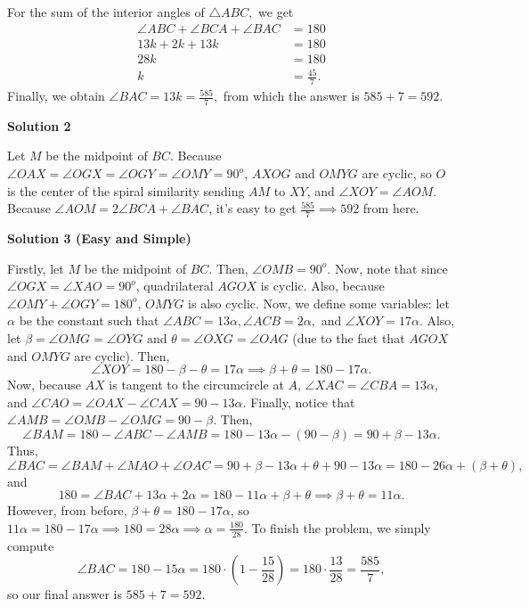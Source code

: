 \begin{enumerate}
 For the sum of the interior angles of $\triangle ABC,$ we get
 \begin{align*} \angle ABC + \angle BCA + \angle BAC &= 180 \\ 13k+2k+13k&=180 \\ 28k&=180 \\ k&=\frac{45}{7}. \end{align*}
Finally, we obtain $\angle BAC=13k=\frac{585}{7},$ from which the answer is $585+7=\boxed{592}.$




\textbf{Solution 2}

Let $M$ be the midpoint of $BC$. Because $\angle{OAX}=\angle{OGX}=\angle{OGY}=\angle{OMY}=90^o$, $AXOG$ and $OMYG$ are cyclic, so $O$ is the center of the spiral similarity sending $AM$ to $XY$, and $\angle{XOY}=\angle{AOM}$. Because $\angle{AOM}=2\angle{BCA}+\angle{BAC}$, it's easy to get $\frac{585}{7} \implies \boxed{592}$ from here.

 



\textbf{Solution 3 (Easy and Simple)}

Firstly, let $M$ be the midpoint of $BC$. Then, $\angle OMB = 90^o$. Now, note that since $\angle OGX = \angle XAO = 90^o$, quadrilateral $AGOX$ is cyclic. Also, because $\angle OMY + \angle OGY = 180^o$, $OMYG$ is also cyclic. Now, we define some variables: let $\alpha$ be the constant such that $\angle ABC = 13\alpha, \angle ACB = 2\alpha,$ and $\angle XOY = 17\alpha$. Also, let $\beta = \angle OMG = \angle OYG$ and $\theta = \angle OXG = \angle OAG$ (due to the fact that $AGOX$ and $OMYG$ are cyclic). Then, 
 \[\angle XOY = 180 - \beta - \theta = 17\alpha \implies \beta + \theta = 180 - 17\alpha.\] Now, because $AX$ is tangent to the circumcircle at $A$, $\angle XAC = \angle CBA = 13\alpha$, and $\angle CAO = \angle OAX - \angle CAX = 90 - 13\alpha$. Finally, notice that $\angle AMB = \angle OMB - \angle OMG = 90 - \beta$. Then, 
 \[\angle BAM = 180 - \angle ABC - \angle AMB = 180 - 13\alpha - (90 - \beta) = 90 + \beta - 13\alpha.\] Thus, 
 \[\angle BAC = \angle BAM + \angle MAO + \angle OAC = 90 + \beta - 13\alpha + \theta + 90 - 13\alpha = 180 - 26\alpha + (\beta + \theta),\] and 
 \[180 = \angle BAC + 13\alpha + 2\alpha = 180 - 11\alpha + \beta + \theta \implies \beta + \theta = 11\alpha.\] However, from before, $\beta+\theta = 180 - 17 \alpha$, so $11 \alpha = 180 - 17 \alpha \implies 180 = 28 \alpha \implies \alpha = \frac{180}{28}$. To finish the problem, we simply compute 
 \[\angle BAC = 180 - 15 \alpha = 180 \cdot \left(1 - \frac{15}{28}\right) = 180 \cdot \frac{13}{28} = \frac{585}{7},\] so our final answer is $585+7=\boxed{592}$.


\end{enumerate}
